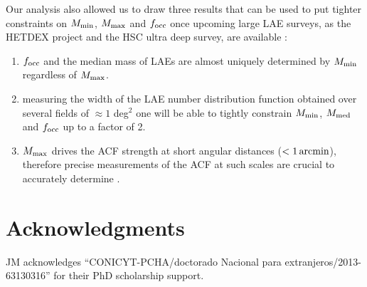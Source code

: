 \documentclass{emulateapj}
\newcommand{\mmax}{{\ifmmode{{M_{\rm max}}}\else{${M_{\rm max}}$}\fi}}
\begin{document}
Our analysis also allowed us to draw three results that can be used to put tighter constraints on $M_{\rm min}$, $M_{\rm max}$ and $f_{\rm occ}$ once upcoming large LAE surveys, as the HETDEX project \citep{Hetdex2011} and the HSC ultra deep survey, are available :
\begin{enumerate}
\item $f_{\rm occ}$ and the median mass of LAEs are almost uniquely determined by $M_{\rm min}$ regardless of $M_{\rm max}$. \item measuring the width of the LAE number distribution function obtained over several fields of $\approx 1$ deg$^2$ one will be able to tightly constrain  $M_{\rm min}$, $M_{\rm med}$ and $f_{\rm occ}$ up to a factor of  2. 
\item  $M_{\rm max}$ drives the ACF strength at short angular distances ($<1\,\rm arcmin$), therefore precise measurements of the ACF at such scales are crucial to accurately determine \mmax.
\end{enumerate}



\section*{Acknowledgments} 

JM acknowledges ``CONICYT-PCHA/doctorado Nacional para extranjeros/2013-63130316'' for their PhD scholarship support. 




\end{document}
